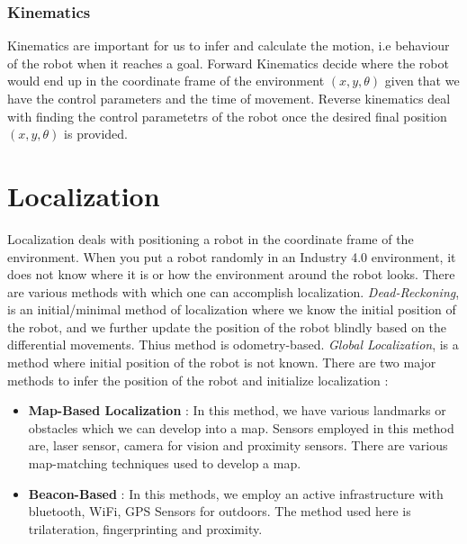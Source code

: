 \subsubsection{Kinematics}
Kinematics are important for us to infer and calculate the motion, i.e behaviour of the robot when it reaches a goal.
Forward Kinematics decide where the robot would end up in the coordinate frame of the environment $(x,y,\theta)$ given that we have the control parameters and the time of movement. Reverse kinematics deal with finding the control parametetrs of the robot once the desired final position $(x,y,\theta)$ is provided.

 \section{Localization}
Localization deals with positioning a robot in the coordinate frame of the environment. When you put a robot randomly in an Industry 4.0 environment, it does not know where it is or how the environment around the robot looks. There are various methods with which one can accomplish localization. 
\textit{Dead-Reckoning}, is an initial/minimal method of localization where we know the initial position of the robot, and we further update the position of the robot blindly based on the differential movements. Thius method is odometry-based. 
\textit{Global Localization}, is a method where initial position of the robot is not known. There are two major methods to infer the position of the robot and initialize localization :
\begin{itemize}
    \item \textbf{Map-Based Localization} : In this method, we have various landmarks or obstacles which we can develop into a map. Sensors employed in this method are, laser sensor, camera for vision and proximity sensors. There are various map-matching techniques used to develop a map.
    \item \textbf{Beacon-Based} : In this methods, we employ an active infrastructure with bluetooth, WiFi, GPS Sensors for outdoors. The method used here is trilateration, fingerprinting and proximity.
\end{itemize}


